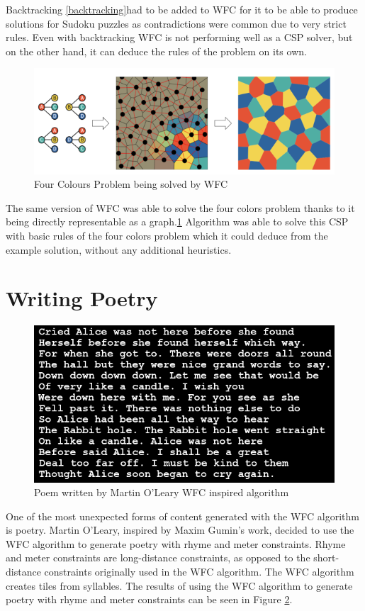 \documentclass[shortabstract, english, inz]{iithesis}
\begin{document}
Backtracking \ref{backtracking}had to be added to WFC for it to be able to produce solutions for Sudoku puzzles as contradictions were common due to very strict rules. Even with backtracking WFC is not performing well as a CSP solver, but on the other hand, it can deduce the rules of the problem on its own. \cite{GraphBased}
\begin{figure}[H]
\centering
\includegraphics[width=1\textwidth, angle=0]{images/fourcolours.png}
\caption{Four Colours Problem being solved by WFC \cite{GraphBased}}
\label{fig:fourcolours}
\end{figure}
The same version of WFC was able to solve the four colors problem thanks to it being directly representable as a graph.\ref{fig:fourcolours} Algorithm was able to solve this CSP with basic rules of the four colors problem which it could deduce from the example solution, without any additional heuristics. \cite{GraphBased}


\section{Writing Poetry}
\begin{figure}[H]
\centering
\includegraphics[width=1\textwidth, angle=0]{images/poem.png}
\caption{Poem written by Martin O’Leary WFC inspired algorithm  \cite{wfcpoem}}
\label{fig:poem}
\end{figure}
One of the most unexpected forms of content generated with the WFC algorithm is poetry. Martin O'Leary, inspired by Maxim Gumin's work, decided to use the WFC algorithm to generate poetry with rhyme and meter constraints. Rhyme and meter constraints are long-distance constraints, as opposed to the short-distance constraints originally used in the WFC algorithm. The WFC algorithm creates tiles from syllables. The results of using the WFC algorithm to generate poetry with rhyme and meter constraints can be seen in Figure \ref{fig:poem}. \cite{Smith, wfcpoem}
\end{document}
